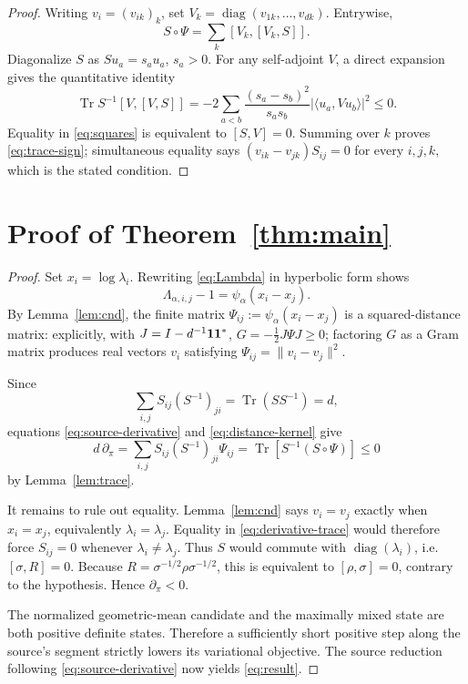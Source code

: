 \documentclass[11pt]{article}
\newcommand{\Tr}{\operatorname{Tr}}
\newcommand{\diag}{\operatorname{diag}}
\begin{document}
\begin{proof}
Writing $v_i=(v_{ik})_k$, set
$V_k=\diag(v_{1k},\ldots,v_{dk})$.  Entrywise,
\[
 S\mathbin{\circ}\Psi
 =\sum_k[V_k,[V_k,S]].
 \tag{9}\label{eq:double}
\]
Diagonalize $S$ as $S u_a=s_a u_a$, $s_a>0$.  For any self-adjoint $V$,
a direct expansion gives the quantitative identity
\[
 \Tr S^{-1}[V,[V,S]]
 =-2\sum_{a<b}\frac{(s_a-s_b)^2}{s_as_b}
       |\langle u_a,Vu_b\rangle|^2\leq0.
 \tag{10}\label{eq:squares}
\]
Equality in \eqref{eq:squares} is equivalent to $[S,V]=0$.  Summing over
$k$ proves \eqref{eq:trace-sign}; simultaneous equality says
$(v_{ik}-v_{jk})S_{ij}=0$ for every $i,j,k$, which is the stated
condition.
\end{proof}

\section*{Proof of Theorem~\ref{thm:main}}

\begin{proof}
Set $x_i=\log\lambda_i$.  Rewriting \eqref{eq:Lambda} in hyperbolic form
shows
\[
 \Lambda_{\alpha,i,j}-1=\psi_\alpha(x_i-x_j).
 \tag{11}\label{eq:distance-kernel}
\]
By Lemma~\ref{lem:cnd}, the finite matrix
$\Psi_{ij}:=\psi_\alpha(x_i-x_j)$ is a squared-distance matrix: explicitly,
with $J=I-d^{-1}{\bf1}{\bf1}^{*}$,
$G=-\tfrac12J\Psi J\geq0$; factoring $G$ as a Gram matrix produces real
vectors $v_i$ satisfying $\Psi_{ij}=\|v_i-v_j\|^2$.

Since
\[
 \sum_{i,j}S_{ij}(S^{-1})_{ji}
 =\Tr(SS^{-1})=d,
\]
equations \eqref{eq:source-derivative} and
\eqref{eq:distance-kernel} give
\[
 d\,\partial_\pi
 =\sum_{i,j}S_{ij}(S^{-1})_{ji}\Psi_{ij}
 =\Tr\!\left[S^{-1}(S\mathbin{\circ}\Psi)\right]\leq0
 \tag{12}\label{eq:derivative-trace}
\]
by Lemma~\ref{lem:trace}.

It remains to rule out equality.  Lemma~\ref{lem:cnd} says
$v_i=v_j$ exactly when $x_i=x_j$, equivalently
$\lambda_i=\lambda_j$.  Equality in \eqref{eq:derivative-trace} would
therefore force $S_{ij}=0$ whenever $\lambda_i\ne\lambda_j$.  Thus $S$
would commute with $\diag(\lambda_i)$, i.e.\
$[\sigma,R]=0$.  Because
$R=\sigma^{-1/2}\rho\sigma^{-1/2}$, this is equivalent to
$[\rho,\sigma]=0$, contrary to the hypothesis.  Hence
$\partial_\pi<0$.

The normalized geometric-mean candidate and the maximally mixed state are
both positive definite states.  Therefore a sufficiently short positive
step along the source's segment strictly lowers its variational objective.
The source reduction following \eqref{eq:source-derivative} now yields
\eqref{eq:result}.
\end{proof}
\end{document}
